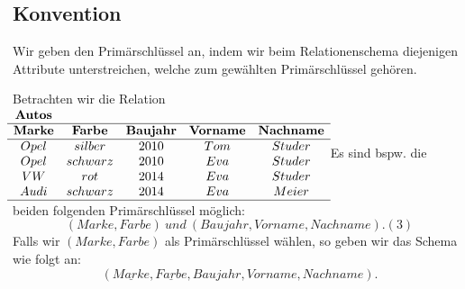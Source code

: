 \documentclass[../DatenbankenFS23.tex]{subfiles}
\begin{document}
\subsection*{Konvention}
Wir geben den Primärschlüssel an, indem wir beim Relationenschema
diejenigen Attribute unterstreichen, welche zum gewählten Primärschlüssel
gehören.

\begin{beispiel}
    Betrachten wir die Relation\newline
    $\begin{matrix}
        \textbf{Autos}\\
        \hline
        \textbf{Marke} & \textbf{Farbe} & \textbf{Baujahr} & \textbf{Vorname} & \textbf{Nachname}\\
        \hline
        Opel & silber & 2010 & Tom & Studer\\
        Opel & schwarz & 2010 & Eva & Studer\\
        VW & rot & 2014 & Eva  & Studer\\
        Audi & schwarz & 2014 & Eva  & Meier\\
        \hline
    \end{matrix}$\newline\newline
    Es sind bspw. die beiden folgenden Primärschlüssel möglich:
    \[(Marke, Farbe)\ und\ (Baujahr, Vorname, Nachname) . (3)\]
    Falls wir $(Marke, Farbe)$ als Primärschlüssel wählen, so geben wir das
    Schema wie folgt an:
    \[(\underline{Marke}, \underline{Farbe}, Baujahr, Vorname, Nachname) .\]
\end{beispiel}
\end{document}
